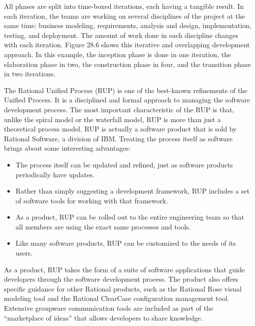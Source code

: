 All phases are split into time-boxed iterations, each having a tangible result. In each iteration, the teams are working on several disciplines of the project at the same time: business modeling, requirements, analysis and design, implementation, testing, and deployment. The amount of work done in each discipline changes with each iteration. Figure 28.6 shows this iterative and overlapping development approach. In this example, the inception phase is done in one iteration, the elaboration phase in two, the construction phase in four, and the transition phase in two iterations.



The Rational Unified Process (RUP) is one of the best-known refinements of the Unified Process. It is a disciplined and formal approach to managing the software development process. The most important characteristic of the RUP is that, unlike the spiral model or the waterfall model, RUP is more than just a theoretical process model. RUP is actually a software product that is sold by Rational Software, a division of IBM. Treating the process itself as software brings about some interesting advantages:

\begin{itemize}
\item
The process itself can be updated and refined, just as software products periodically have updates.

\item
Rather than simply suggesting a development framework, RUP includes a set of software tools for working with that framework.

\item
As a product, RUP can be rolled out to the entire engineering team so that all members are using the exact same processes and tools.

\item
Like many software products, RUP can be customized to the needs of its users.
\end{itemize}


As a product, RUP takes the form of a suite of software applications that guide developers through the software development process. The product also offers specific guidance for other Rational products, such as the Rational Rose visual modeling tool and the Rational ClearCase configuration management tool. Extensive groupware communication tools are included as part of the “marketplace of ideas” that allows developers to share knowledge.


